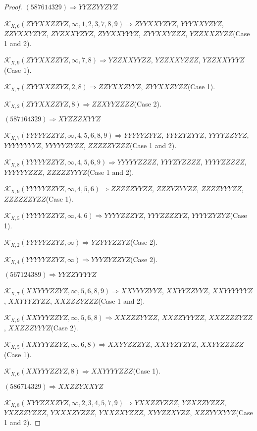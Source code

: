 \documentclass[12pt]{article}
\theoremstyle{plain}
\theoremstyle{definition}
\theoremstyle{remark}
\newcommand{\fancy}[1]{\mathcal{#1}}
\def\K{\fancy{K}}
\begin{document}
\begin{proof}
	$(5 8 7 6 1 4 3 2 9)\Rightarrow YYZZYYZYZ$
	
	
	$\K_{X,6}(ZYYXXZZYZ,\infty,1, 2, 3, 7, 8, 9)\Rightarrow $$ZYYXXYZYZ$, $YYYXXYZYZ$, $ZZYXXYZYZ$, $ZYZXXYZYZ$, $ZYYXXYYYZ$, $ZYYXXYZZZ$, $YZZXXZYZZ$(Case 1 and 2).
	
	$\K_{X,9}(ZYYXXZZYZ,\infty,7, 8)\Rightarrow $$YZZXXYYZZ$, $YZZXXYZZZ$, $YZZXXYYYZ$(Case 1).
	
	$\K_{X,7}(ZYYXXZZYZ,2, 8)\Rightarrow $$ZZYXXZYYZ$, $ZYYXXZYZZ$(Case 1).
	
	$\K_{X,2}(ZYYXXZZYZ,8)\Rightarrow $$ZZXYYZZZZ$(Case 2).
	
	
	
	$(5 8 7 1 6 4 3 2 9)\Rightarrow XYZZZXYYZ$
	
	
	$\K_{X,7}(YYYYYZZYZ,\infty,4, 5, 6, 8, 9)\Rightarrow $$YYYYYZYYZ$, $YYYZYZYYZ$, $YYYYZZYYZ$, $YYYYYYYYZ$, $YYYYYZYZZ$, $ZZZZZYZZZ$(Case 1 and 2).
	
	$\K_{X,8}(YYYYYZZYZ,\infty,4, 5, 6, 9)\Rightarrow $$YYYYYZZZZ$, $YYYZYZZZZ$, $YYYYZZZZZ$, $YYYYYYZZZ$, $ZZZZZYYYZ$(Case 1 and 2).
	
	$\K_{X,9}(YYYYYZZYZ,\infty,4, 5, 6)\Rightarrow $$ZZZZZYYZZ$, $ZZZYZYYZZ$, $ZZZZYYYZZ$, $ZZZZZZYZZ$(Case 1).
	
	$\K_{X,5}(YYYYYZZYZ,\infty,4, 6)\Rightarrow $$YYYYZZZYZ$, $YYYZZZZYZ$, $YYYYZYZYZ$(Case 1).
	
	$\K_{X,2}(YYYYYZZYZ,\infty)\Rightarrow $$YZYYYZZYZ$(Case 2).
	
	$\K_{X,4}(YYYYYZZYZ,\infty)\Rightarrow $$YYYZYZZYZ$(Case 2).
	
	
	
	$(5 6 7 1 2 4 3 8 9)\Rightarrow YYZZYYYYZ$
	
	
	$\K_{X,7}(XXYYYZZYZ,\infty,5, 6, 8, 9)\Rightarrow $$XXYYYZYYZ$, $XXYYZZYYZ$, $XXYYYYYYZ$, $XXYYYZYZZ$, $XXZZZYZZZ$(Case 1 and 2).
	
	$\K_{X,9}(XXYYYZZYZ,\infty,5, 6, 8)\Rightarrow $$XXZZZYYZZ$, $XXZZYYYZZ$, $XXZZZZYZZ$, $XXZZZYYYZ$(Case 2).
	
	$\K_{X,5}(XXYYYZZYZ,\infty,6, 8)\Rightarrow $$XXYYZZZYZ$, $XXYYZYZYZ$, $XXYYZZZZZ$(Case 1).
	
	$\K_{X,6}(XXYYYZZYZ,8)\Rightarrow $$XXYYYYZZZ$(Case 1).
	
	
	
	$(5 8 6 7 1 4 3 2 9)\Rightarrow XXZZYXXYZ$
	
	
	$\K_{X,8}(XYYZZXZYZ,\infty,2, 3, 4, 5, 7, 9)\Rightarrow $$YXXZZYZZZ$, $YZXZZYZZZ$, $YXZZZYZZZ$, $YXXXZYZZZ$, $YXXZXYZZZ$, $XYYZZXYZZ$, $XZZYYXYYZ$(Case 1 and 2).
	

\end{proof}
\end{document}
